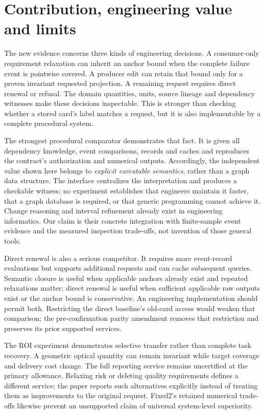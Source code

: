 \section{Contribution, engineering value and limits}\label{sec:r9-discussion}
The new evidence concerns three kinds of engineering decisions. A consumer-only requirement relaxation can inherit an anchor bound when the complete failure event is pointwise covered. A producer edit can retain that bound only for a proven invariant requested projection. A remaining request requires direct renewal or refusal. The domain quantities, units, source lineage and dependency witnesses make these decisions inspectable. This is stronger than checking whether a stored card's label matches a request, but it is also implementable by a complete procedural system.

The strongest procedural comparator demonstrates that fact. It is given all dependency knowledge, event comparisons, records and caches and reproduces the contract's authorization and numerical outputs. Accordingly, the independent value shown here belongs to \emph{explicit executable semantics}, rather than a graph data structure. The interface centralizes the interpretation and produces a checkable witness; no experiment establishes that engineers maintain it faster, that a graph database is required, or that generic programming cannot achieve it. Change reasoning and interval refinement already exist in engineering informatics. Our claim is their concrete integration with finite-sample event evidence and the measured inspection trade-offs, not invention of those general tools.

Direct renewal is also a serious competitor. It requires more event-record evaluations but supports additional requests and can cache subsequent queries. Semantic closure is useful when applicable anchors already exist and repeated relaxations matter; direct renewal is useful when sufficient applicable raw outputs exist or the anchor bound is conservative. An engineering implementation should permit both. Restricting the direct baseline's old-card access would weaken that comparison; the pre-confirmation parity amendment removes that restriction and preserves its prior supported services.

The ROI experiment demonstrates selective transfer rather than complete task recovery. A geometric optical quantity can remain invariant while target coverage and delivery cost change. The full reporting service remains uncertified at the primary allowance. Relaxing risk or deleting quality requirements defines a different service; the paper reports such alternatives explicitly instead of treating them as improvements to the original request. Fixed2's retained numerical trade-offs likewise prevent an unsupported claim of universal system-level superiority.

